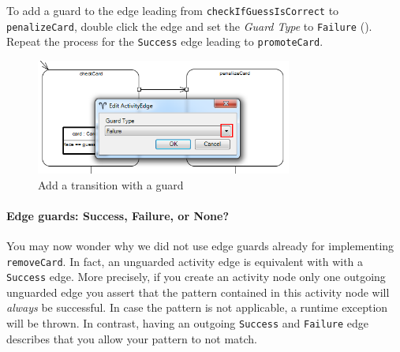 \newpage
\begin{stepbystep}

\item To add a guard to the edge leading from \texttt{check\-If\-Guess\-Is\-Correct} to \texttt{penalize\-Card}, double click the edge
and set the \emph{Guard Type} to \texttt{Failure} ().
Repeat the process for the \texttt{Success} edge leading to \texttt{promoteCard}.

\vspace{0.5cm}

\begin{figure}[htbp]
\begin{center}
  \includegraphics[width=0.75\textwidth]{../../org.moflon.doc.handbook.03_storyDiagrams/04_checkCard/visCheImages/ea_addTransitionGuard}
  \caption{Add a transition with a guard}
  \label{ea:sdm_check_guard}
\end{center}
\end{figure}

\vspace{0.5cm}

\end{stepbystep}

\paragraph{Edge guards: Success, Failure, or None?} You may now wonder why we did not use edge guards already for implementing \texttt{removeCard}.
In fact, an unguarded activity edge is equivalent with with a \texttt{Success} edge.
More precisely, if you create an activity node only one outgoing unguarded edge you assert that the pattern contained in this activity node will \emph{always} be successful.
In case the pattern is not applicable, a runtime exception will be thrown.
In contrast, having an outgoing \texttt{Success} and \texttt{Failure} edge describes that you allow your pattern to not match.

